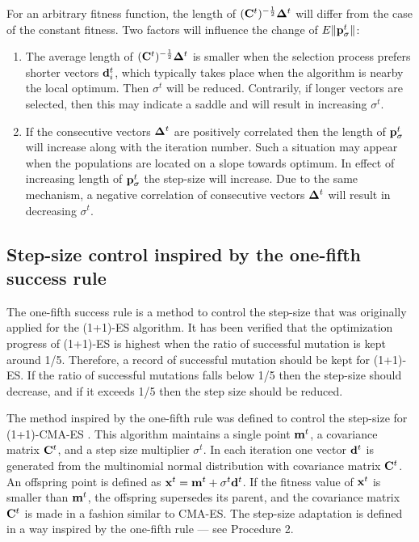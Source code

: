 \documentclass[runningheads,a4paper]{llncs}
\newcommand{\wek}[1]{
    {\bf #1} 
}
\newcommand{\mat}[1]{
    {\bf #1} 
}
\begin{document}
For an arbitrary fitness function, the length of $(\mat{C}^t)^{-\frac{1}{2}}\wek{\Delta}^t$ will differ from the case of the constant fitness. Two factors will influence the change of $ E\|\wek{p}_\sigma^{t}\|$:
\begin{enumerate}
\item The average length of $(\mat{C}^t)^{-\frac{1}{2}}\wek{\Delta}^t$ is smaller when the selection process prefers shorter vectors $\wek{d}_i^t$, which typically takes place when the algorithm is nearby the local optimum. Then $\sigma^t$ will be reduced. Contrarily, if longer vectors are selected, then this may indicate a saddle and will result in increasing $\sigma^t$.
\item If the consecutive vectors $\wek{\Delta}^t$ are positively correlated then the length of 
$\wek{p}_\sigma^{t}$ will increase along with the iteration number. Such a situation may appear when the populations are located on a slope towards optimum. In effect of increasing length of $\wek{p}_\sigma^{t}$ the step-size will increase. Due to the same mechanism, a negative correlation of consecutive vectors $\wek{\Delta}^t$ will result in decreasing $\sigma^t$.
\end{enumerate}

\subsection{Step-size control inspired by the one-fifth success rule}

The one-fifth success rule \cite{Schwefel95} is a method to control the step-size that was originally applied for the (1+1)-ES algorithm. It has been verified that the optimization progress of (1+1)-ES is highest when the ratio of successful mutation is kept around 1/5. Therefore, a record of successful mutation should be kept for (1+1)-ES. If the ratio of successful mutations falls below 1/5 then the step-size should decrease, and if it exceeds 1/5 then the step size should be reduced.


The method inspired by the one-fifth rule was defined to control the step-size for (1+1)-CMA-ES \cite{Suttorp09}. This algorithm maintains a single point $\wek{m}^t$, a covariance matrix $\mat{C}^t$, and a step size multiplier $\sigma^t$. In each iteration one vector $\wek{d}^t$ is generated from the multinomial normal distribution with covariance matrix $\mat{C}^t$. An offspring point is defined as $\wek{x}^t=\wek{m}^t+\sigma^t\wek{d}^t$. If the fitness value of $\wek{x}^t$ is smaller than $\wek{m}^t$, the offspring supersedes its parent, and the covariance matrix $\mat{C}^t$ is made in a fashion similar to CMA-ES. The step-size adaptation is defined in a way inspired by the one-fifth rule --- see Procedure 2.
\end{document}
